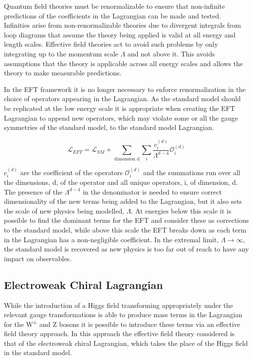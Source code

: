 Quantum field theories must be renormalizable to ensure that non-infinite predictions of the coefficients in the Lagrangian can be made and tested.  Infinities arise from non-renormalizable theories due to divergent integrals from loop diagrams that assume the theory being applied is valid at all energy and length scales.  Effective field theories act to avoid such problems by only integrating up to the momentum scale $\Lambda$ and not above it.  This avoids assumptions that the theory is applicable across all energy scales and allows the theory to make measurable predictions.  

In the EFT framework it is no longer necessary to enforce renormalization in the choice of operators appearing in the Lagrangian.  As the standard model should be replicated at the low energy scale it is appropriate when creating the EFT Lagrangian to append new operators, which may violate some or all the gauge symmetries of the standard model, to the standard model Lagrangian.

\begin{equation}
\mathcal{L}_{EFT} = \mathcal{L}_{SM} + \sum_{\text{dimension d}} \sum_{i} \frac{c_{i}^{(d)}}{\Lambda^{d-4}} \mathcal{O}_{i}^{(d)}
\end{equation}

$c_{i}^{(d)}$ are the coefficient of the operators $\mathcal{O}_{i}^{(d)}$ and the summations run over all the dimensions, d, of the operator and all unique operators, i, of dimension, d.  The presence of the $\Lambda^{d-4}$ in the denominator is needed to ensure correct dimensionality of the new terms being added to the Lagrangian, but it also sets the scale of  new physics being modelled, $\Lambda$.  At energies below this scale it is possible to find the dominant terms for the EFT and consider these as corrections to the standard model, while above this scale the EFT breaks down as each term in the Lagrangian has a non-negligible coefficient.  In the extremal limit, $\Lambda \rightarrow \infty$, the standard model is recovered as new physics is too far out of reach to have any impact on observables.

\subsection{Electroweak Chiral Lagrangian}
While the introduction of a Higgs field transforming appropriately under the relevant gauge transformations is able to produce mass terms in the Lagrangian for the $\text{W}^{\pm}$ and Z bosons it is possible to introduce these terms via an effective field theory approach.  In this approach the effective field theory considered is that of the electroweak chiral Lagrangian, which takes the place of the Higgs field in the standard model.  

